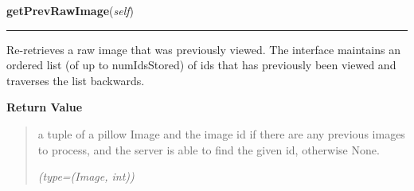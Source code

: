 \hspace{.8\funcindent}\begin{boxedminipage}{\funcwidth}

    \raggedright \textbf{getPrevRawImage}(\textit{self})

    \vspace{-1.5ex}

    \rule{\textwidth}{0.5\fboxrule}
\setlength{\parskip}{2ex}
    Re-retrieves a raw image that was previously viewed. The interface 
    maintains an ordered list (of up to numIdsStored) of ids that has 
    previously been viewed and traverses the list backwards.

\setlength{\parskip}{1ex}
      \textbf{Return Value}
    \vspace{-1ex}

      \begin{quote}
      a tuple of a pillow Image and the image id if there are any previous 
      images to process, and the server is able to find the given id, 
      otherwise None.

      {\it (type=(Image, int))}

      \end{quote}

    \end{boxedminipage}

    \label{client_rest:ImagingInterface:getImageInfo}

    \vspace{0.5ex}

